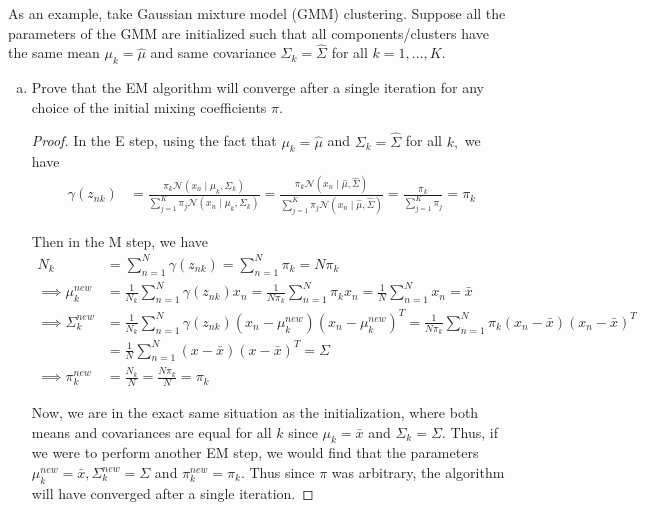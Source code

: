 \documentclass{article}
\begin{document}
As an example, take Gaussian mixture model (GMM) clustering. Suppose all the parameters of the GMM are initialized such that all components/clusters have the same mean $\mu_k=\hat{\mu}$ and same covariance $\Sigma_k=\hat{\Sigma}$ for all $k=1,\ldots,K$.
\begin{enumerate}[(a)]
	\item Prove that the EM
		algorithm will converge after a single iteration for any choice of the initial mixing coefficients $\pi$.
		\begin{proof}
			In the E step, using the fact that $\mu_k=\hat\mu$ and $\Sigma_k=\hat\Sigma$ for all $k,$ we have
			\begin{align*}
				\gamma(z_{nk}) &= \frac{\pi_k \mathcal N\left(x_n\mid \mu_k, \Sigma_k\right)}{\sum_{j=1}^{K}\pi_j \mathcal N\left( x_n\mid \mu_k, \Sigma_k \right)} = \frac{\pi_k \mathcal N\left( x_n\mid \hat\mu, \hat\Sigma \right)}{\sum_{j=1}^{K} \pi_j \mathcal N\left( x_n\mid \hat\mu, \hat\Sigma \right)} = \frac{\pi_k}{\sum_{j=1}^{K}\pi_j} = \pi_k
			\end{align*}

			Then in the M step, we have
			\begin{align*}
				N_k &= \sum_{n=1}^{N} \gamma(z_{nk}) = \sum_{n=1}^{N} \pi_k = N\pi_k \\
				\implies \mu_k^{new} &= \frac{1}{N_k} \sum_{n=1}^{N} \gamma(z_{nk}) x_n = \frac{1}{N\pi_k} \sum_{n=1}^{N} \pi_k x_n = \frac{1}{N} \sum_{n=1}^{N} x_n = \bar x \\
				\implies\Sigma_k^{new} &= \frac{1}{N_k} \sum_{n=1}^{N} \gamma(z_{nk}) \left( x_n-\mu_k^{new} \right)\left( x_n-\mu_k^{new} \right)^T = \frac{1}{N\pi_k} \sum_{n=1}^{N} \pi_k \left( x_n- \bar x\right) \left( x_n-\bar x \right)^T \\
				&= \frac{1}{N} \sum_{n=1}^{N} \left( x-\bar x \right)\left( x-\bar x \right)^T = \Sigma \\
				\implies \pi_k^{new} &= \frac{N_k}{N} = \frac{N\pi_k}{N} = \pi_k
			\end{align*}

			Now, we are in the exact same situation as the initialization, where both means and covariances are equal for all $k$ since $\mu_k=\bar x$ and $\Sigma_k=\Sigma.$ Thus, if we were to perform another EM step, we would find that the parameters $\mu_k^{new} = \bar x, \Sigma_k^{new}=\Sigma$ and $\pi_k^{new} = \pi_k.$ Thus since $\pi$ was arbitrary, the algorithm will have converged after a single iteration.
		\end{proof}


\end{enumerate}
\end{document}
